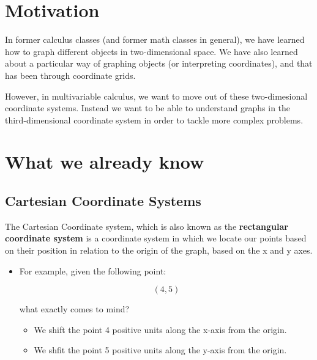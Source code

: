 \documentclass{report}
\begin{document}
\begin{sloppypar}
\section{Motivation}
In former calculus classes (and former math
classes in general), we have learned how to
graph different objects in two-dimensional
space. We have also learned about a particular
way of graphing objects (or interpreting
coordinates), and that has been through
coordinate grids.

\par However, in multivariable calculus, we
want to move out of these two-dimesional
coordinate systems. Instead we want to
be able to understand graphs in the
third-dimensional coordinate system in order
to tackle more complex problems.

\section{What we already know}
\subsection{Cartesian Coordinate Systems}
The Cartesian Coordinate system, which
is also known as the \textbf{rectangular
  coordinate system} is a
coordinate system in which we locate our
points based on their position in relation
to the origin of the graph, based on the
x and y axes.
\begin{itemize}

  \item For example, given the following point:

        \[ (4,5)\]

        what exactly comes to mind?
        \begin{itemize}
          \item We shift the point 4 positive
                units along the x-axis from
                the origin.
          \item We shfit the point 5
                positive units along the y-axis
                from the origin.

        \end{itemize}
\end{itemize}


\end{sloppypar}
\end{document}
